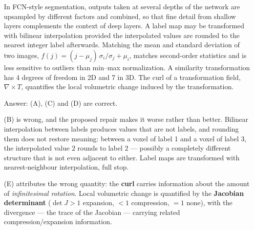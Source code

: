 \documentclass[11pt]{exam}
\begin{document}
\begin{questions}
\begin{choices}
  \choice In FCN-style segmentation, outputs taken at several depths of the network are upsampled
  by different factors and combined, so that fine detail from shallow layers complements the
  context of deep layers.
  \choice A label map may be transformed with bilinear interpolation provided the interpolated
  values are rounded to the nearest integer label afterwards.
  \choice Matching the mean and standard deviation of two images,
  $f(j) = (j - \mu_j)\,\sigma_i/\sigma_j + \mu_i$, matches second-order statistics and is less
  sensitive to outliers than min--max normalization.
  \choice A similarity transformation has 4 degrees of freedom in 2D and 7 in 3D.
  \choice The curl of a transformation field, $\nabla \times T$, quantifies the local volumetric
  change induced by the transformation.
\end{choices}

\begin{solution}
  Answer: (A), (C) and (D) are correct.

  (B) is wrong, and the proposed repair makes it worse rather than better. Bilinear interpolation
  between labels produces values that are not labels, and rounding them does not restore meaning:
  between a voxel of label 1 and a voxel of label 3, the interpolated value $2$ rounds to label 2
  --- possibly a completely different structure that is not even adjacent to either. Label maps are
  transformed with nearest-neighbour interpolation, full stop.

  (E) attributes the wrong quantity: the \textbf{curl} carries information about the amount of
  \emph{infinitesimal rotation}. Local volumetric change is quantified by the \textbf{Jacobian
  determinant} ($\det J > 1$ expansion, $< 1$ compression, $= 1$ none), with the divergence ---
  the trace of the Jacobian --- carrying related compression/expansion information.
\end{solution}

\end{questions}
\end{document}
